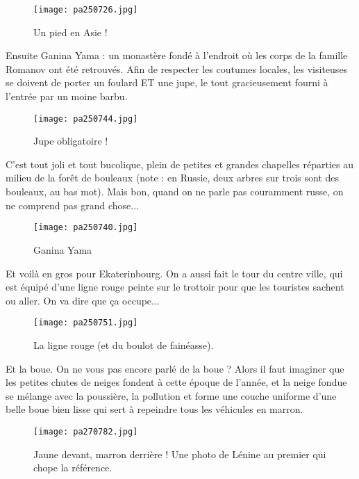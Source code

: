 \documentclass{book}
\begin{document}
\begin{figure}[h]
\centering
\texttt{[image: pa250726.jpg]}
\caption*{ Un pied en Asie !}
\end{figure}

Ensuite Ganina Yama : un monastère fondé à l'endroit où les corps de la famille Romanov ont été retrouvés. Afin de respecter les coutumes locales, les visiteuses se doivent de porter un foulard ET une jupe, le tout gracieusement fourni à l'entrée par un moine barbu.


\begin{figure}[h]
\centering
\texttt{[image: pa250744.jpg]}
\caption*{ Jupe obligatoire !}
\end{figure}

C'est tout joli et tout bucolique, plein de petites et grandes chapelles réparties au milieu de la forêt de bouleaux (note : en Russie, deux arbres sur trois sont des bouleaux, au bas mot). Mais bon, quand on ne parle pas couramment russe, on ne comprend pas grand chose...


\begin{figure}[h]
\centering
\texttt{[image: pa250740.jpg]}
\caption*{ Ganina Yama}
\end{figure}

Et voilà en gros pour Ekaterinbourg. On a aussi fait le tour du centre ville, qui est équipé d'une ligne rouge peinte sur le trottoir pour que les touristes sachent ou aller. On va dire que ça occupe...


\begin{figure}[h]
\centering
\texttt{[image: pa250751.jpg]}
\caption*{ La ligne rouge (et du boulot de fainéasse).}
\end{figure}

Et la boue. On ne vous pas encore parlé de la boue ? Alors il faut imaginer que les petites chutes de neiges fondent à cette époque de l'année, et la neige fondue se mélange avec la poussière, la pollution et forme une couche uniforme d'une belle boue bien lisse qui sert à repeindre tous les véhicules en marron.


\begin{figure}[h]
\centering
\texttt{[image: pa270782.jpg]}
\caption*{ Jaune devant, marron derrière ! Une photo de Lénine au premier qui chope la référence.}
\end{figure}
\end{document}
